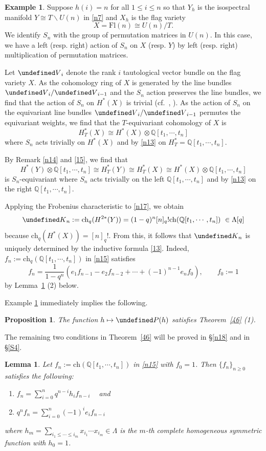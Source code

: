 \documentclass[11pt]{article}
\newtheorem{proposition}[theo]{Proposition}
\newtheorem{lemma}[theo]{Lemma}
\theoremstyle{definition}
\newtheorem{example}[theo]{Example}
\numberwithin{equation}{section}
\let\cal\undefined
\numberwithin{equation}{section}
\newcommand\QQ{\mathbb{Q}}
\newcommand{\cal}{\mathcal}
\newcommand\cK{{\cal K}}
\newcommand\cP{{\cal P}}
\newcommand\cV{{\cal V}}
\newcommand\ch{\mathrm{ch} }
\newcommand\beq{\begin{equation}}
\newcommand\eeq{\end{equation}}
\newcommand\Fl{\mathrm{Fl}}
\begin{document}
\begin{example}\label{33}
	Suppose $h(i)=n$ for all $1\leq i \leq n$ so that $Y_h$ is the isospectral manifold $Y\cong T\backslash U(n)$ in \eqref{n7} and $X_h$ is the flag variety $$X=\Fl(n)\cong U(n)/T.$$
	We identify $S_n$ with the group of permutation matrices in $U(n)$. 
	In this case, we have a left (resp. right) action of $S_n$ on $X$ (resp. $Y$) by left (resp. right) multiplication of permutation matrices. 
	
	Let $\cV_i$ denote the rank $i$ tautological vector bundle on the flag variety $X$. As the cohomology ring of $X$ is generated by the line bundles $\cV_i/\cV_{i-1}$ and the $S_n$ action preserves the line bundles, we find that the action of $S_n$ on $H^*(X)$ is trivial (cf.~\cite[Proposition 4.2]{Tym}, \cite[Example 2.12]{KL}). 
	As the action of $S_n$ on the equivariant line bundles $\cV_i/\cV_{i-1}$ permutes the equivariant weights, we find that the $T$-equivariant cohomology of $X$ is 
	$$H^*_T(X)\cong H^*(X)\otimes \QQ[t_1,\cdots,t_n]$$
	where $S_n$ acts trivially on $H^*(X)$ and by \eqref{n13} on $H^*_T=\QQ[t_1,\cdots,t_n]$.
	
	By Remark \ref{n14} and \eqref{15}, we find that 
	\beq\label{n17}
	H^*(Y)\otimes \QQ[t_1,\cdots,t_n]\cong H^*_T(Y)\cong H^*_T(X)\cong H^*(X)\otimes \QQ[t_1,\cdots,t_n] \eeq
	is $S_n$-equivariant where $S_n$ acts trivially on the left $\QQ[t_1,\cdots,t_n]$ and by \eqref{n13} on the right $\QQ[t_1,\cdots,t_n]$. 
	
	Applying the Frobenius characteristic to \eqref{n17}, we obtain 
	\beq\label{n15}
	\cK_n:=\ch_q(H^{2*}(Y))=(1-q)^n[n]_q! \ch (\QQ[t_1,\cdots,t_n])~\in \Lambda[q]\eeq
	because 
	$\ch_q(H^*(X))=[n]_q!$.
	From this, it follows that $\cK_n$ is uniquely determined by the inductive formula \eqref{13}. 
	Indeed, $f_n:=\ch_q (\QQ[t_1,\cdots,t_n])$ in \eqref{n15} satisfies 
		\[f_n=\frac{1}{1-q^n}\left(e_{1}f_{n-1}-e_2f_{n-2}+\cdots +(-1)^{n-1}e_nf_0\right), \qquad f_0:=1\]
	by Lemma~\ref{n21} (2) below. 
		\end{example}
		
Example \ref{33} immediately implies the following.
\begin{proposition}\label{n16}
The function $h\mapsto \cP(h)$ satisfies  Theorem~\ref{46} (1). 
\end{proposition}


The remaining two conditions in Theorem~\ref{46} will be proved in \S\ref{n18} and in \S\ref{S4}.  

\begin{lemma}\label{n21}
	Let $f_n:=\ch(\QQ[t_1,\cdots,t_n])$ in \eqref{n15} with $f_0=1$. Then $\{f_n\}_{n\geq 0}$ satisfies the following: 
	\begin{enumerate}
		\item $ f_n=\sum_{i=0}^n q^{n-i}h_if_{n-i}$ ~ and 
		\item $q^nf_n=\sum_{i=0}^n(-1)^ie_if_{n-i}$
	\end{enumerate}
	where 
	$h_m=\sum_{i_1\leq \cdots \leq i_m}x_{i_1}\cdots x_{i_m} \in \Lambda$ is the $m$-th complete homogeneous symmetric function with $h_0=1$. 
\end{lemma}	
\end{document}
